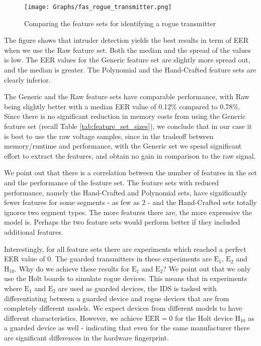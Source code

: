 \documentclass[conference]{IEEEtran}
\begin{document}
  \begin{figure}[t]
    \centering
    \texttt{[image: Graphs/fas\_rogue\_transmitter.png]}
    \caption{Comparing the feature sets for identifying a rogue transmitter}
    \label{fig:rogue_transmitter_results}
  \end{figure}
  
  The figure shows that intruder detection yields the best results in term of EER when we use the Raw feature set. Both the median and the spread of the values is low. The EER values for the Generic feature set are slightly more spread out, and the median is greater. The Polynomial and the Hand-Crafted feature sets are clearly inferior.
  
  The Generic and the Raw feature sets have comparable performance, with Raw being slightly better with a median EER value of 0.12\% compared to 0.78\%. Since there is no significant reduction in memory costs from using the Generic feature set (recall Table \ref{tab:feature_set_sizes}), we conclude that in our case it is best to use the raw voltage samples, since in the tradeoff between memory/runtime and performance, with the Generic set we spend significant effort to extract the features, and obtain no gain in comparison to the raw signal.
  
  We point out that there is a correlation between the number of features in the set and the performance of the feature set. The feature sets with reduced performance, namely the Hand-Crafted and Polynomial sets, have significantly fewer features for some segments - as few as 2 - and the Hand-Crafted sets totally ignores two segment types. The more features there are, the more expressive the model is. Perhaps the two feature sets would perform better if they included additional features.
  
  Interestingly, for all feature sets there are experiments which reached a perfect EER value of 0. The guarded transmitters in these experiments are \(\text{E}_1\), \(\text{E}_2\) and \(\text{H}_{10}\). Why do we achieve these results for \(\text{E}_1\) and \(\text{E}_2\)? We point out that we only use the Holt boards to simulate rogue devices. This means that in experiments where \(\text{E}_1\) and \(\text{E}_2\) are used as guarded devices, the IDS is tasked with differentiating between a guarded device and rogue devices that are from completely different models. We expect devices from different models to have different characteristics. However, we achieve \(\text{EER}=0\) for the Holt device \(\text{H}_{10}\) as a guarded device as well - indicating that even for the same manufacturer there are significant differences in the hardware fingerprint.
  
\end{document}
